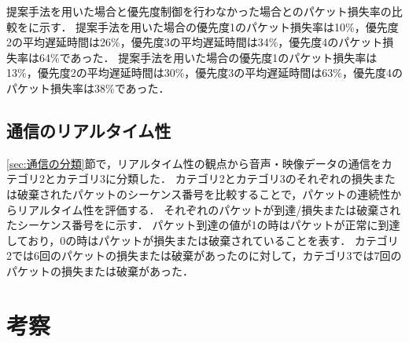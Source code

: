 \documentclass[a4paper,11pt,uplatex]{ujreport}
\begin{document}

  提案手法を用いた場合と優先度制御を行わなかった場合とのパケット損失率の比較をに示す．
  提案手法を用いた場合の優先度1のパケット損失率は10\%，優先度2の平均遅延時間は26\%，優先度3の平均遅延時間は34\%，優先度4のパケット損失率は64\%であった．
  提案手法を用いた場合の優先度1のパケット損失率は13\%，優先度2の平均遅延時間は30\%，優先度3の平均遅延時間は63\%，優先度4のパケット損失率は38\%であった．


\section{通信のリアルタイム性}
\label{sec:通信のリアルタイム性}

  \ref{sec:通信の分類}節で，リアルタイム性の観点から音声・映像データの通信をカテゴリ2とカテゴリ3に分類した．
  カテゴリ2とカテゴリ3のそれぞれの損失または破棄されたパケットのシーケンス番号を比較することで，パケットの連続性からリアルタイム性を評価する．
  それぞれのパケットが到達/損失または破棄されたシーケンス番号をに示す．
  パケット到達の値が1の時はパケットが正常に到達しており，0の時はパケットが損失または破棄されていることを表す．
  カテゴリ2では6回のパケットの損失または破棄があったのに対して，カテゴリ3では7回のパケットの損失または破棄があった．



\chapter{考察}
\label{chap:考察}
\end{document}
